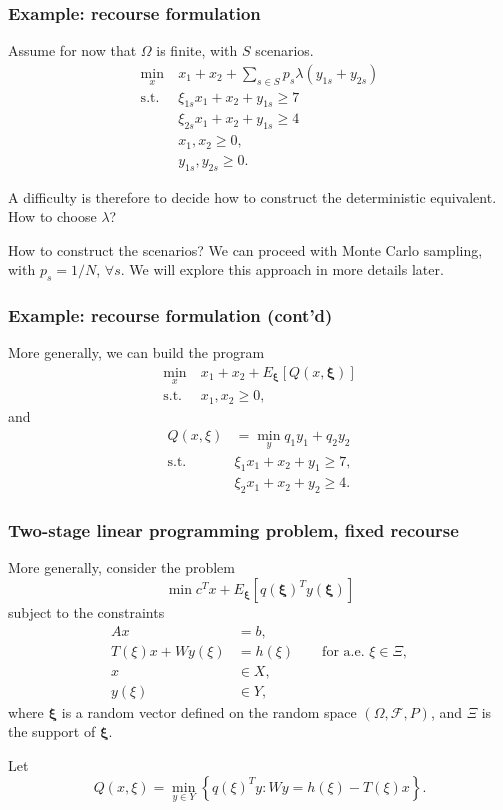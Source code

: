 \documentclass{beamer}
\def\bxi{\boldsymbol\xi}
\def\bxi{\boldsymbol\xi}
\begin{document}
\begin{frame}
	\frametitle{Example: recourse formulation}
	
	Assume for now that $\Omega$ is finite, with $S$ scenarios.
	\begin{align*}
	\min_x\ & x_1+x_2 + \sum_{s \in S} p_s \lambda (y_{1s} + y_{2s})\\
	\mbox{s.t. } & \xi_{1s}x_1 + x_2 + y_{1s} \geq 7 \\
	& \xi_{2s}x_1 + x_2 + y_{1s} \geq 4 \\
	& x_1, x_2 \geq 0,\\
	& y_{1s}, y_{2s} \geq 0.
	\end{align*}
	
	A difficulty is therefore to decide how to construct the deterministic equivalent.
	How to choose $\lambda$?
	
	\mbox{}
	
	How to construct the scenarios?
	We can proceed with Monte Carlo sampling, with $p_s = 1/N$, $\forall s$.
	We will explore this approach in more details later.
	
\end{frame}

\begin{frame}
	\frametitle{Example: recourse formulation (cont'd)}
	
	More generally, we can build the program
	\begin{align*}
	\min_x\ & x_1+x_2 + E_{\bxi}[Q(x,\bxi)] \\
	\mbox{s.t. } & x_1, x_2 \geq 0,
	\end{align*}
	and
	\begin{align*}
	Q(x, \xi) &= \min_y q_1y_1 + q_2y_2 \\
	\mbox{s.t. } & \xi_1 x_1 + x_2 + y_1 \geq 7, \\
	& \xi_2 x_1 + x_2 + y_2 \geq 4.
	\end{align*}
	
\end{frame}

\begin{frame}
\frametitle{Two-stage linear programming problem, fixed recourse}

More generally, consider the problem
\[
\min c^Tx + E_{\bxi}[q(\bxi)^Ty(\bxi)]
\]
subject to the constraints
\begin{align*}
Ax &= b, \\
T(\xi)x + Wy(\xi) &= h(\xi) \qquad \text{for a.e. } \xi \in \Xi, \\
x & \in X, \\
y(\xi) & \in Y,
\end{align*}
where $\bxi$ is a random vector defined on the random space 
$(\Omega, \mathcal{F}, P)$, and $\Xi$ is the support of $\bxi$.

\mbox{}

Let
\[
Q(x, \xi) = \min_{y \in Y} \left\lbrace q(\xi)^Ty: Wy = h(\xi) - T(\xi)x \right\rbrace.
\]
\end{frame}
\end{document}
